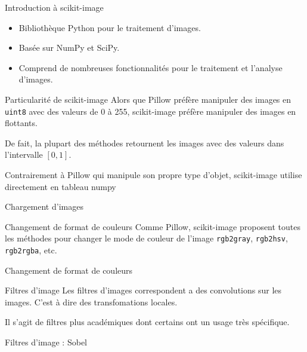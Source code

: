 \begin{frame}{Introduction à scikit-image}
  \begin{itemize}
    \item Bibliothèque Python pour le traitement d'images.
    \item Basée sur NumPy et SciPy.
    \item Comprend de nombreuses fonctionnalités pour le traitement et l'analyse
          d'images.
  \end{itemize}
\end{frame}

\begin{frame}{Particularité de scikit-image}
  Alors que \alert{Pillow} préfère manipuler des images en \texttt{uint8} avec des valeurs de 0 à 255, \alert{scikit-image} préfère manipuler des images en flottants.

  De fait, la plupart des méthodes retournent les images avec des valeurs dans
  l'intervalle $[0,1]$.

  Contrairement à Pillow qui manipule son propre type d'objet, scikit-image utilise directement en tableau numpy
\end{frame}

\begin{frame}{Chargement d'images}
\end{frame}

\begin{frame}{Changement de format de couleurs}
  Comme Pillow, scikit-image proposent toutes les méthodes pour changer le mode de couleur de l'image \texttt{rgb2gray}, \texttt{rgb2hsv}, \texttt{rgb2rgba}, etc.
\end{frame}

\begin{frame}{Changement de format de couleurs}
\end{frame}

\begin{frame}{Filtres d'image}
  Les filtres d'images correspondent a des convolutions sur les images. C'est à dire des transfomations locales.
  
  Il s'agit de filtres plus académiques dont certains ont un usage très spécifique.
\end{frame}

\begin{frame}{Filtres d'image : Sobel}
\end{frame}

